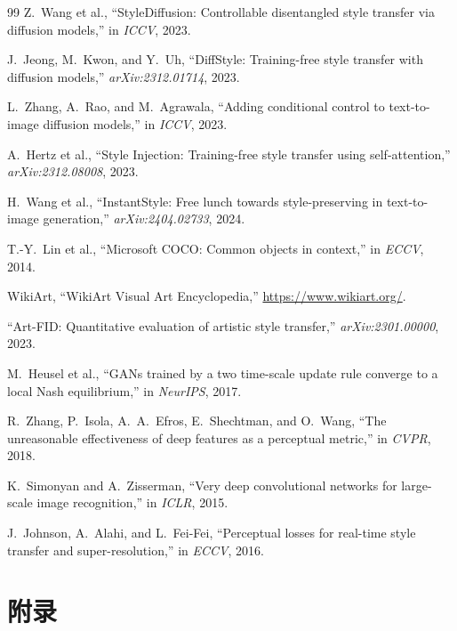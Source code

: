 \documentclass[twocolumn,a4paper,11pt]{ctexart}
\begin{document}
\begin{thebibliography}{99}
 Z.~Wang et al., ``StyleDiffusion: Controllable disentangled style transfer via diffusion models,'' in \emph{ICCV}, 2023.

 J.~Jeong, M.~Kwon, and Y.~Uh, ``DiffStyle: Training-free style transfer with diffusion models,'' \emph{arXiv:2312.01714}, 2023.

 L.~Zhang, A.~Rao, and M.~Agrawala, ``Adding conditional control to text-to-image diffusion models,'' in \emph{ICCV}, 2023.

 A.~Hertz et al., ``Style Injection: Training-free style transfer using self-attention,'' \emph{arXiv:2312.08008}, 2023.

 H.~Wang et al., ``InstantStyle: Free lunch towards style-preserving in text-to-image generation,'' \emph{arXiv:2404.02733}, 2024.

 T.-Y.~Lin et al., ``Microsoft COCO: Common objects in context,'' in \emph{ECCV}, 2014.

 WikiArt, ``WikiArt Visual Art Encyclopedia,'' \url{https://www.wikiart.org/}.

 ``Art-FID: Quantitative evaluation of artistic style transfer,'' \emph{arXiv:2301.00000}, 2023.

 M.~Heusel et al., ``GANs trained by a two time-scale update rule converge to a local Nash equilibrium,'' in \emph{NeurIPS}, 2017.

 R.~Zhang, P.~Isola, A.~A.~Efros, E.~Shechtman, and O.~Wang, ``The unreasonable effectiveness of deep features as a perceptual metric,'' in \emph{CVPR}, 2018.

 K.~Simonyan and A.~Zisserman, ``Very deep convolutional networks for large-scale image recognition,'' in \emph{ICLR}, 2015.

 J.~Johnson, A.~Alahi, and L.~Fei-Fei, ``Perceptual losses for real-time style transfer and super-resolution,'' in \emph{ECCV}, 2016.

\end{thebibliography}

\section*{附录}
\end{document}
